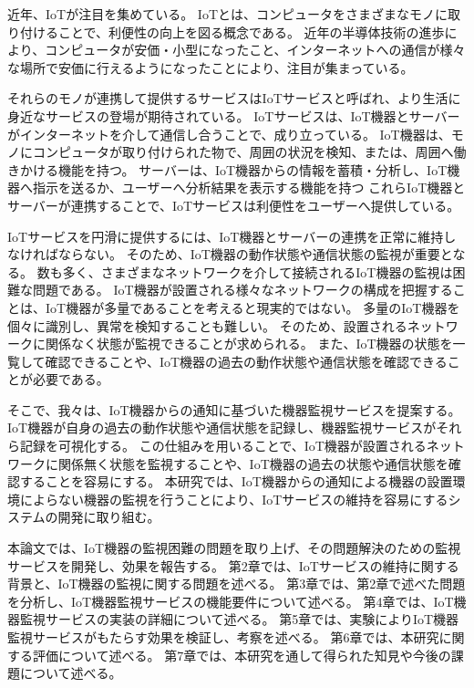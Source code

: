 
近年、IoTが注目を集めている。
IoTとは、コンピュータをさまざまなモノに取り付けることで、利便性の向上を図る概念である。
近年の半導体技術の進歩により、コンピュータが安価・小型になったこと、インターネットへの通信が様々な場所で安価に行えるようになったことにより、注目が集まっている。
\medskip

それらのモノが連携して提供するサービスはIoTサービスと呼ばれ、より生活に身近なサービスの登場が期待されている。
IoTサービスは、IoT機器とサーバーがインターネットを介して通信し合うことで、成り立っている。
IoT機器は、モノにコンピュータが取り付けられた物で、周囲の状況を検知、または、周囲へ働きかける機能を持つ。
サーバーは、IoT機器からの情報を蓄積・分析し、IoT機器へ指示を送るか、ユーザーへ分析結果を表示する機能を持つ
これらIoT機器とサーバーが連携することで、IoTサービスは利便性をユーザーへ提供している。
\medskip

IoTサービスを円滑に提供するには、IoT機器とサーバーの連携を正常に維持しなければならない。
そのため、IoT機器の動作状態や通信状態の監視が重要となる。
数も多く、さまざまなネットワークを介して接続されるIoT機器の監視は困難な問題である。
IoT機器が設置される様々なネットワークの構成を把握することは、IoT機器が多量であることを考えると現実的ではない。
多量のIoT機器を個々に識別し、異常を検知することも難しい。
そのため、設置されるネットワークに関係なく状態が監視できることが求められる。
また、IoT機器の状態を一覧して確認できることや、IoT機器の過去の動作状態や通信状態を確認できることが必要である。
\medskip

そこで、我々は、IoT機器からの通知に基づいた機器監視サービスを提案する。
IoT機器が自身の過去の動作状態や通信状態を記録し、機器監視サービスがそれら記録を可視化する。
この仕組みを用いることで、IoT機器が設置されるネットワークに関係無く状態を監視することや、IoT機器の過去の状態や通信状態を確認することを容易にする。
本研究では、IoT機器からの通知による機器の設置環境によらない機器の監視を行うことにより、IoTサービスの維持を容易にするシステムの開発に取り組む。
\medskip

本論文では、IoT機器の監視困難の問題を取り上げ、その問題解決のための監視サービスを開発し、効果を報告する。
第2章では、IoTサービスの維持に関する背景と、IoT機器の監視に関する問題を述べる。
第3章では、第2章で述べた問題を分析し、IoT機器監視サービスの機能要件について述べる。
第4章では、IoT機器監視サービスの実装の詳細について述べる。
第5章では、実験によりIoT機器監視サービスがもたらす効果を検証し、考察を述べる。
第6章では、本研究に関する評価について述べる。
第7章では、本研究を通して得られた知見や今後の課題について述べる。


